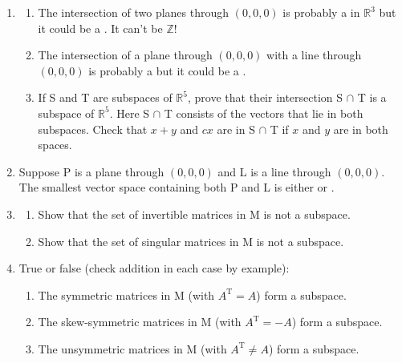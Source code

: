 \documentclass[14pt, a4paper]{article}
\begin{document}
\begin{enumerate}
    \item
          \begin{enumerate}
              \item The intersection of two planes through $(0,0,0)$ is probably a \underline{\hspace{2cm}} in $\mathbb{R}^3$ but it could be a \underline{\hspace{2cm}}. It can't be $\mathbb{Z}$!
              \item The intersection of a plane through $(0,0,0)$ with a line through $(0,0,0)$ is probably a \underline{\hspace{2cm}} but it could be a \underline{\hspace{2cm}}.
              \item If S and T are subspaces of $\mathbb{R}^5$, prove that their intersection S $\cap$ T is a subspace of $\mathbb{R}^5$. Here S $\cap$ T consists of the vectors that lie in both subspaces. Check that $x+y$ and $cx$ are in S $\cap$ T if $x$ and $y$ are in both spaces.
          \end{enumerate}

    \item Suppose P is a plane through $(0,0,0)$ and L is a line through $(0,0,0)$. The smallest vector space containing both P and L is either \underline{\hspace{2cm}} or \underline{\hspace{2cm}}.

    \item
          \begin{enumerate}
              \item Show that the set of invertible matrices in M is not a subspace.
              \item Show that the set of singular matrices in M is not a subspace.
          \end{enumerate}

    \item True or false (check addition in each case by example):
          \begin{enumerate}
              \item The symmetric matrices in M (with $A^{\mathrm{T}} = A$) form a subspace.
              \item The skew-symmetric matrices in M (with $A^{\mathrm{T}} = -A$) form a subspace.
              \item The unsymmetric matrices in M (with $A^{\mathrm{T}} \ne A$) form a subspace.
          \end{enumerate}
\end{enumerate}
\end{document}
